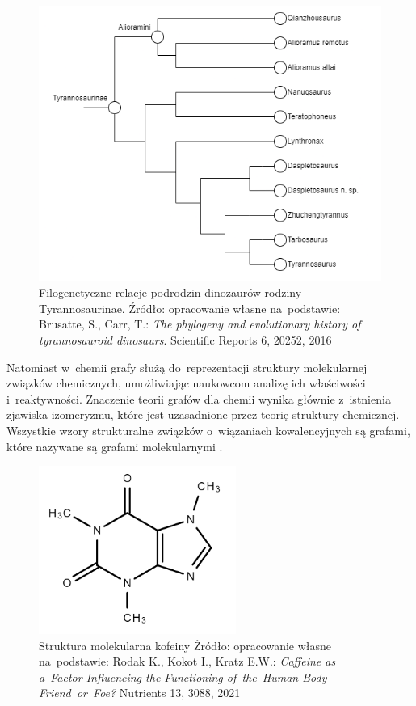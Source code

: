 \begin{figure}[ht]
	\centering
	\includegraphics[width=12cm]{resources/introduction/images/dino.png}
	\caption{Filogenetyczne relacje podrodzin dinozaurów rodziny Tyrannosaurinae.
		Źródło: opracowanie własne na~podstawie:
		Brusatte, S., Carr, T.: \textit{The phylogeny and evolutionary history of tyrannosauroid dinosaurs}. Scientific Reports 6, 20252, 2016}
    \label{Fig:intro-3}
\end{figure}
\FloatBarrier

Natomiast w~chemii grafy służą do~reprezentacji struktury molekularnej związków chemicznych,
umożliwiając naukowcom analizę ich właściwości i~reaktywności.
Znaczenie teorii grafów dla chemii wynika głównie z~istnienia zjawiska izomeryzmu,
które jest uzasadnione przez teorię struktury chemicznej.
Wszystkie wzory strukturalne związków o~wiązaniach kowalencyjnych są grafami,
które nazywane są grafami molekularnymi \cite{Balaban1985}.

\begin{figure}[ht]
	\centering
	\includegraphics[height=5.5cm]{resources/introduction/images/chem.png}
	\caption{Struktura molekularna kofeiny
		Źródło: opracowanie własne na~podstawie:
		Rodak K., Kokot I., Kratz E.W.: \textit{Caffeine as a~Factor Influencing the Functioning of~the~Human Body-Friend~or~Foe?} Nutrients 13, 3088, 2021}
    \label{Fig:intro-4}
\end{figure}
\FloatBarrier

